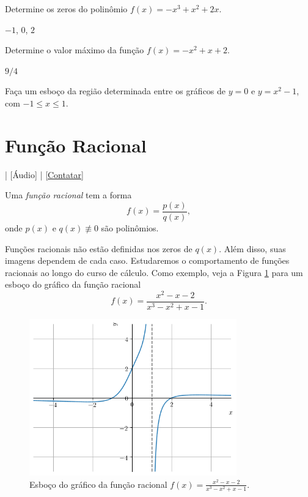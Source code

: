 \begin{exer}
  Determine os zeros do polinômio $f(x) = -x^3+x^2+2x$.
\end{exer}
\begin{resp}
  $-1$, $0$, $2$
\end{resp}

\begin{exer}
  Determine o valor máximo da função $f(x) = -x^2 + x + 2$.
\end{exer}
\begin{resp}
  $9/4$
\end{resp}

\begin{exer}
  Faça um esboço da região determinada entre os gráficos de $y=0$ e $y=x^2-1$, com $-1\leq x \leq 1$.
\end{exer}

\section{Função Racional}\label{cap_funcao_sec_funracio}

\begin{flushright}
  [Vídeo] | [Áudio] | \href{https://phkonzen.github.io/notas/contato.html}{[Contatar]}
\end{flushright}

Uma \emph{função racional} tem a forma
\begin{equation}
  f(x) = \frac{p(x)}{q(x)},
\end{equation}
onde $p(x)$ e $q(x)\not\equiv 0$ são polinômios.

Funções racionais não estão definidas nos zeros de $q(x)$. Além disso, suas imagens dependem de cada caso. Estudaremos o comportamento de funções racionais ao longo do curso de cálculo. Como exemplo, veja a Figura \ref{fig:racional_grafico} para um esboço do gráfico da função racional
\begin{equation}
  f(x) = \frac{x^2-x-2}{x^3-x^2+x-1}.
\end{equation}

\begin{figure}[H]
  \centering
  \includegraphics[width=0.8\textwidth]{./cap_funcao/dados/fig_racional_grafico/fig_racional_grafico}
  \caption{Esboço do gráfico da função racional $\displaystyle f(x) = \frac{x^{2} - x - 2}{x^{3} - x^{2} + x - 1}$.}
  \label{fig:racional_grafico}
\end{figure}

